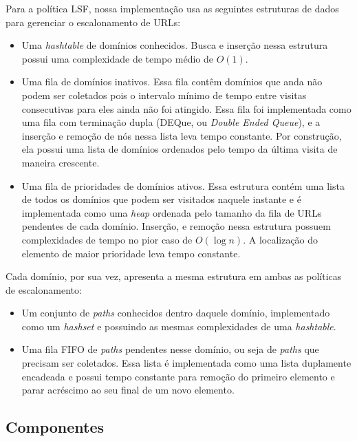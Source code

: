 \documentclass[10pt,twocolumn]{article}
\begin{document}
Para a política LSF, nossa implementação usa as seguintes estruturas de
dados para gerenciar o escalonamento de URLs:

\begin{itemize}

\item Uma \emph{hashtable} de domínios conhecidos. Busca e inserção
nessa estrutura possui uma complexidade de tempo médio de \(O\left(1 
\right)\).

\item Uma fila de domínios inativos. Essa fila contêm domínios que
anda não podem ser coletados pois o intervalo mínimo de tempo entre
visitas consecutivas para eles ainda não foi atingido. Essa fila foi
implementada como uma fila com terminação dupla (DEQue, ou \emph{Double
Ended Queue}), e a inserção e remoção de nós nessa lista leva tempo
constante. Por construção, ela possui uma lista de domínios ordenados
pelo tempo da última visita de maneira crescente.

\item Uma fila de prioridades de domínios ativos. Essa estrutura contém
uma lista de todos os domínios que podem ser visitados naquele instante
e é implementada como uma \emph{heap} ordenada pelo tamanho da fila de
URLs pendentes de cada domínio. Inserção, e remoção nessa estrutura
possuem complexidades de tempo no pior caso de \(O\left(\log n\right)\).
A localização do elemento de maior prioridade leva tempo constante.

\end{itemize}


Cada domínio, por sua vez, apresenta a mesma estrutura em ambas as
políticas de escalonamento:
\begin{itemize}
\item Um conjunto de \emph{paths} conhecidos dentro daquele domínio,
implementado como um \emph{hashset} e possuindo as mesmas complexidades
de uma \emph{hashtable}.
\item Uma fila FIFO de \emph{paths} pendentes nesse domínio, ou seja de
\emph{paths} que precisam ser coletados. Essa lista é implementada como
uma lista duplamente encadeada e possui tempo constante para remoção do
primeiro elemento e parar acréscimo ao seu final de um novo elemento.
\end{itemize}


\subsection{Componentes}
\end{document}
